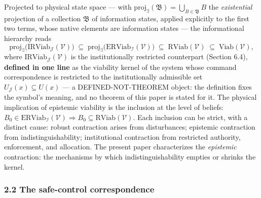 \documentclass[11pt]{article}
\begin{document}
Projected to physical state space --- with
\(\mathrm{proj}_{\exists}(\mathfrak{B}) = \bigcup_{B \in \mathfrak{B}} B\)
the \emph{existential} projection of a collection \(\mathfrak{B}\) of
information states, applied explicitly to the first two terms, whose
native elements are information states --- the informational hierarchy
reads
\[\mathrm{proj}_{\exists}\big(\mathrm{IRViab}_{\mathcal{J}}(\mathcal{V})\big) \;\subseteq\; \mathrm{proj}_{\exists}\big(\mathrm{ERViab}_{\mathcal{I}}(\mathcal{V})\big) \;\subseteq\; \mathrm{RViab}(\mathcal{V}) \;\subseteq\; \mathrm{Viab}(\mathcal{V}),\]
where \(\mathrm{IRViab}_{\mathcal{J}}(\mathcal{V})\) is the
institutionally restricted counterpart (Section 6.4), \textbf{defined in
one line} as the viability kernel of the system whose command
correspondence is restricted to the institutionally admissible set
\(U_{\mathcal{J}}(x) \subseteq U(x)\) --- a DEFINED-NOT-THEOREM object:
the definition fixes the symbol's meaning, and no theorem of this paper
is stated for it. The physical implication of epistemic viability is the
inclusion at the level of beliefs:
\(B_0 \in \mathrm{ERViab}_{\mathcal{I}}(\mathcal{V}) \Rightarrow B_0 \subseteq \mathrm{RViab}(\mathcal{V})\).
Each inclusion can be strict, with a distinct cause: robust contraction
arises from disturbances; epistemic contraction from
indistinguishability; institutional contraction from restricted
authority, enforcement, and allocation. The present paper characterizes
the \emph{epistemic} contraction: the mechanisms by which
indistinguishability empties or shrinks the kernel.

\subsubsection{2.2 The safe-control
correspondence}\label{the-safe-control-correspondence}
\end{document}

